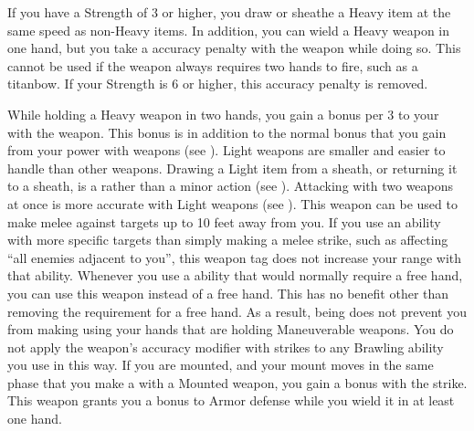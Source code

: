     If you have a Strength of 3 or higher, you draw or sheathe a Heavy item at the same speed as non-Heavy items.
    In addition, you can wield a Heavy weapon in one hand, but you take a  accuracy penalty with the weapon while doing so.
    This cannot be used if the weapon always requires two hands to fire, such as a titanbow.
    If your Strength is 6 or higher, this accuracy penalty is removed.

    While holding a Heavy weapon in two hands, you gain a  bonus per 3  to your  with the weapon.
    This bonus is in addition to the normal bonus that you gain from your power with weapons (see ).
     Light weapons are smaller and easier to handle than other weapons.
    Drawing a Light item from a sheath, or returning it to a sheath, is a  rather than a minor action (see ).
    Attacking with two weapons at once is more accurate with Light weapons (see ).
    \label{Long Weapon} This weapon can be used to make melee  against targets up to 10 feet away from you.
    If you use an ability with more specific targets than simply making a melee strike, such as affecting ``all enemies adjacent to you'', this weapon tag does not increase your range with that ability.
     Whenever you use a \atBrawling ability that would normally require a free hand, you can use this weapon instead of a free hand.
    This has no benefit other than removing the requirement for a free hand.
    As a result, being \grappled does not prevent you from making  using your hands that are holding Maneuverable weapons.
    You do not apply the weapon's accuracy modifier with strikes to any Brawling ability you use in this way.
    \label{Mounted Weapon} If you are mounted, and your mount moves in the same phase that you make a  with a Mounted weapon, you gain a   bonus with the strike.
     This weapon grants you a  bonus to Armor defense while you wield it in at least one hand.
